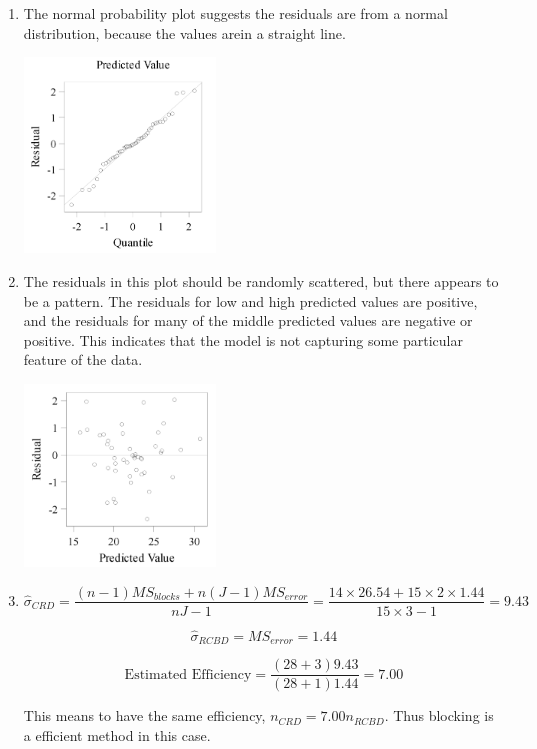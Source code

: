 \documentclass{article}
\begin{document}
\begin{enumerate}[leftmargin = 0 em, label = \arabic*., font = \bfseries]
\begin{enumerate}
\item 
The normal probability plot suggests the residuals are from a normal
distribution, because the values arein a straight line.
\begin{center}
\includegraphics[width = 0.4\textwidth]{resqq.png}
\end{center}


\item 
The residuals in this plot should be randomly scattered, but there appears to be a
pattern. The residuals for low and high predicted values are positive, and the
residuals for many of the middle predicted values are negative or positive. This indicates that
the model is not capturing some particular feature of the data. 
\begin{center}
\includegraphics[width = 0.4\textwidth]{resvspredict.png}
\end{center}

\item 
 \[\hat{\sigma}_{CRD} = \frac{(n-1) MS_{blocks} + n (J-1) MS_{error}}{nJ - 1} = \frac{14 \times 26.54 + 15 \times 2 \times 1.44}{15\times 3 -1} = 9.43\]

 \[\hat{\sigma}_{RCBD} = MS_{error} = 1.44\]

 \[\textrm{Estimated Efficiency} = \frac{(28 + 3) 9.43}{(28 + 1) 1.44} = 7.00\]

 This means to have the same efficiency, $n_{CRD} = 7.00 n_{RCBD}$. Thus blocking is a efficient method in this case.
		\end{enumerate}
		
\end{enumerate}
	
	
\end{document}
